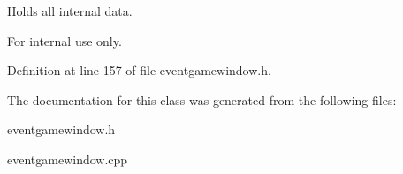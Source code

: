 Holds all internal data. 

\begin{DoxyInternal}{For internal use only.}
\end{DoxyInternal}


Definition at line 157 of file eventgamewindow.h.



The documentation for this class was generated from the following files:\begin{DoxyCompactItemize}
\item 
eventgamewindow.h\item 
eventgamewindow.cpp\end{DoxyCompactItemize}
